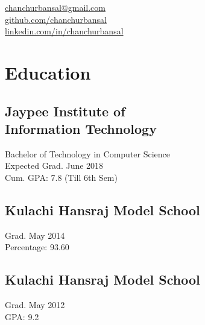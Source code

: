 \documentclass[]{hieudo-build}
\begin{document}
%
%
{
	\faEnvelope \href{mailto:chanchurbansal@gmail.com}{ chanchurbansal@gmail.com}\\
	\faGithub \href{https://github.com/chanchurbansal}{ github.com/chanchurbansal}\\
	\faLinkedinSquare \href{https://www.linkedin.com/in/chanchurbansal/}{ linkedin.com/in/chanchurbansal}
    
}


    
%
%
\begin{minipage}[t]{0.3\textwidth} 

\section{Education} 

\subsection[Jaypee Institute of Information Technology]{Jaypee Institute of \\Information Technology}
Bachelor of Technology in Computer Science \\
Expected Grad. June 2018 \\
Cum. GPA: 7.8 (Till 6th Sem)\\
\sectionsep

\subsection{Kulachi Hansraj Model School}
Grad. May 2014  
\\ Percentage: 93.60
\sectionsep

\subsection{Kulachi Hansraj Model School}
Grad. May 2012  
\\ GPA: 9.2
\sectionsep


\end{minipage}
\end{document}
